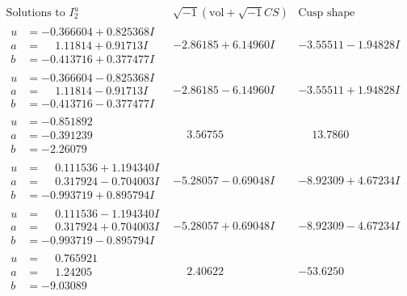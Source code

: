 \documentclass[1p]{elsarticle_modified}
\theoremstyle{definition}
\newcommand{\I}{\sqrt{-1}}
\begin{document}
$$\begin{array}{c|c|c}  
\text{Solutions to }I^u_{2}& \I (\text{vol} + \sqrt{-1}CS) & \text{Cusp shape}\\
 \hline 
\begin{aligned}
u &= -0.366604 + 0.825368 I \\
a &= \phantom{-}1.11814 + 0.91713 I \\
b &= -0.413716 + 0.377477 I\end{aligned}
 & -2.86185 + 6.14960 I & -3.55511 - 1.94828 I \\ \hline\begin{aligned}
u &= -0.366604 - 0.825368 I \\
a &= \phantom{-}1.11814 - 0.91713 I \\
b &= -0.413716 - 0.377477 I\end{aligned}
 & -2.86185 - 6.14960 I & -3.55511 + 1.94828 I \\ \hline\begin{aligned}
u &= -0.851892\phantom{ +0.000000I} \\
a &= -0.391239\phantom{ +0.000000I} \\
b &= -2.26079\phantom{ +0.000000I}\end{aligned}
 & \phantom{-}3.56755\phantom{ +0.000000I} & \phantom{-}13.7860\phantom{ +0.000000I} \\ \hline\begin{aligned}
u &= \phantom{-}0.111536 + 1.194340 I \\
a &= \phantom{-}0.317924 - 0.704003 I \\
b &= -0.993719 + 0.895794 I\end{aligned}
 & -5.28057 - 0.69048 I & -8.92309 + 4.67234 I \\ \hline\begin{aligned}
u &= \phantom{-}0.111536 - 1.194340 I \\
a &= \phantom{-}0.317924 + 0.704003 I \\
b &= -0.993719 - 0.895794 I\end{aligned}
 & -5.28057 + 0.69048 I & -8.92309 - 4.67234 I \\ \hline\begin{aligned}
u &= \phantom{-}0.765921\phantom{ +0.000000I} \\
a &= \phantom{-}1.24205\phantom{ +0.000000I} \\
b &= -9.03089\phantom{ +0.000000I}\end{aligned}
 & \phantom{-}2.40622\phantom{ +0.000000I} & -53.6250\phantom{ +0.000000I} \\ \hline\begin{aligned}

\end{aligned}
\end{array}$$
\end{document}
